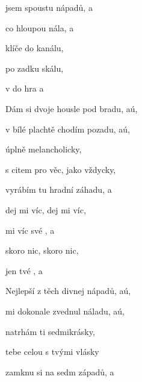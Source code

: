 

\zs
{} jsem spoustu nápadů, a

co  hloupou nála, a

 klíče do kanálu,

 po zadku  skálu,

v   do hra a
\ks

\zs
Dám si dvoje housle pod bradu, aú,

v bílé plachtě chodím pozadu, aú,

úplně melancholicky,

s citem pro věc, jako vždycky,

vyrábím tu hradní záhadu, a
\ks

\zr
{} dej mi víc,  dej mi víc,

  mi víc své , a

 skoro nic,  skoro nic,

 jen  tvé , a
\kr

\zs
Nejlepší z těch divnej nápadů, aú,

mi dokonale zvednul náladu, aú,

natrhám ti sedmikrásky,

tebe celou s tvými vlásky

zamknu si na sedm západů, a
\ks

\zr  \kr

\kp





